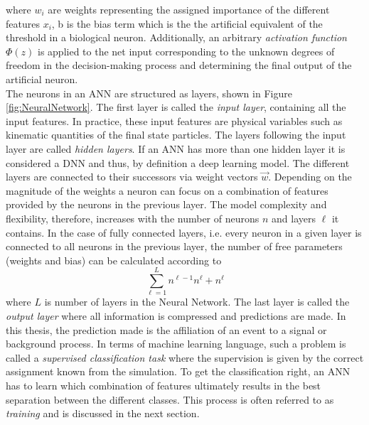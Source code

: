 where $w_i$ are weights representing the assigned importance of the different features $x_i$, b is the bias term which is the the artificial equivalent of the threshold in a biological neuron. Additionally, an arbitrary \textit{activation function} $\Phi(z)$ is applied to the net input corresponding to the unknown degrees of freedom in the decision-making process and determining the final output of the artificial neuron. \\
The neurons in an ANN are structured as layers, shown in Figure \ref{fig:NeuralNetwork}. The first layer is called the \textit{input layer}, containing all the input features. In practice, these input features are physical variables such as kinematic quantities of the final state particles. The layers following the input layer are called \textit{hidden layers}. If an ANN has more than one hidden layer it is considered a DNN and thus, by definition a deep learning model. The different layers are connected to their successors via weight vectors $\vec{w}$. Depending on the magnitude of the weights a neuron can focus on a combination of features provided by the neurons in the previous layer. The model complexity and flexibility, therefore, increases with the number of neurons $n$ and layers $\ell$ it contains. In the case of fully connected layers, i.e. every neuron in a given layer is connected to all neurons in the previous layer, the number of free parameters (weights and bias) can be calculated according to
\begin{equation}
\sum_{\ell=1}^{L} n^{\ell-1} n^{\ell} + n{^\ell}
\label{eq:NumPara}
\end{equation}
where $L$ is number of layers in the Neural Network. The last layer is called the \textit{output layer} where all information is compressed and predictions are made. In this thesis, the prediction made is the affiliation of an event to a signal or background process. In terms of machine learning language, such a problem is called a \textit{supervised classification task} where the supervision is given by the correct assignment known from the simulation. To get the classification right, an ANN has to learn which combination of features ultimately results in the best separation between the different classes. This process is often referred to as \textit{training} and is discussed in the next section.


